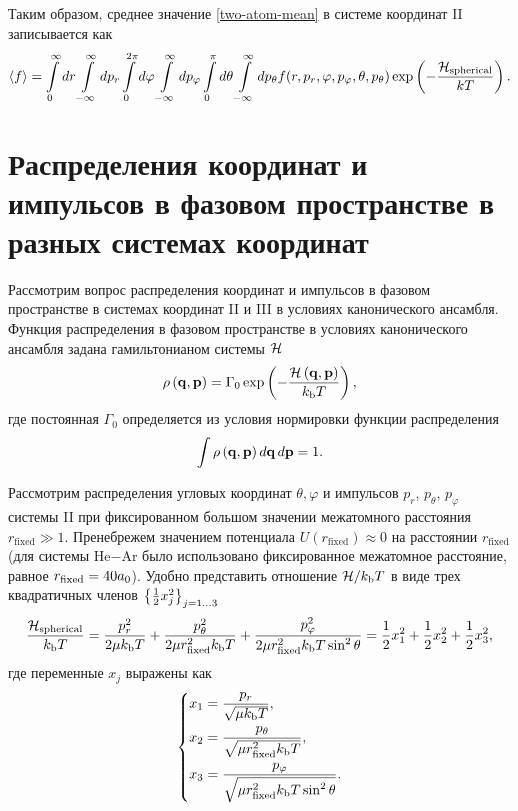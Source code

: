 Таким образом, среднее значение \eqref{two-atom-mean} в системе координат II записывается как
\begin{gather}
    \langle f \rangle = \int\limits_0^\infty dr \int\limits_{-\infty}^\infty dp_r \int\limits_0^{2\pi} d\varphi \int\limits_{-\infty}^\infty dp_\varphi \int\limits_0^\pi d\theta \int\limits_{-\infty}^\infty dp_\theta f(r, p_r, \varphi, p_\varphi, \theta, p_\theta) \exp \left( -\frac{\mathcal{H}_\text{spherical}}{k T} \right). \label{two-atom-mean-spherical}
\end{gather}

\section{Распределения координат и импульсов в фазовом пространстве в разных системах координат} \label{section:two-atom-distributions} 

Рассмотрим вопрос распределения координат и импульсов в фазовом пространстве в системах координат II и III в условиях канонического ансамбля. Функция распределения в фазовом пространстве в условиях канонического ансамбля задана гамильтонианом системы $\mathcal{H}$ \cite{hill} 
\begin{gather}
    \rho \left( \mathbf{q}, \mathbf{p} \right) = \Gamma_0 \exp \left( -\frac{\mathcal{H} \left( \mathbf{q}, \mathbf{p} \right)}{k_\text{b} T} \right),
\end{gather}
% 
где постоянная $\Gamma_0$ определяется из условия нормировки функции распределения
\begin{gather}
    \int \rho \left( \mathbf{q}, \mathbf{p} \right) d \mathbf{q} \, d\mathbf{p} = 1.
\end{gather}

Рассмотрим распределения угловых координат $\theta, \varphi$ и импульсов $p_r$, $p_\theta$, $p_\varphi$ системы II при фиксированном большом значении межатомного расстояния $r_\text{fixed} \gg 1$. Пренебрежем значением потенциала $U(r_\text{fixed}) \approx 0$ на расстоянии $r_\text{fixed}$ (для системы He$-$Ar было использовано фиксированное межатомное расстояние, равное $r_\text{fixed} = 40 a_0$). Удобно представить отношение $\mathcal{H} / k_\text{b} T$ в виде трех квадратичных членов $\left\{ \frac{1}{2} x_j^2 \right\}_{j = 1 \dots 3}$
\begin{gather}
    \frac{\mathcal{H}_\text{spherical}}{k_\text{b} T} = \frac{p_r^2}{2 \mu k_\text{b} T} + \frac{p_\theta^2}{2 \mu r_\text{fixed}^2 k_\text{b} T} + \frac{p_\varphi^2}{2 \mu r_\text{fixed}^2 k_\text{b} T \sin^2 \theta} = \frac{1}{2} x_1^2 + \frac{1}{2} x_2^2 + \frac{1}{2} x_3^2, \label{two-atom-spherical-hamiltonian-xs} 
\end{gather}
%
где переменные $x_j$ выражены как
\begin{gather}
    \left\{
    \begin{aligned}
        x_1 &= \frac{p_r}{\sqrt{\mu k_\text{b} T}}, \\
        x_2 &= \frac{p_\theta}{\sqrt{\mu r_\text{fixed}^2 k_\text{b} T}}, \\
        x_3 &= \frac{p_\varphi}{\sqrt{\mu r_\text{fixed}^2 k_\text{b} T \sin^2 \theta}}.
    \end{aligned}
\right. \label{two-atom-xs}
\end{gather}

